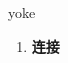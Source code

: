 
\begin{frame}
{\huge yoke}
\begin{center}
\begin{enumerate}\Large
  \item \textbf{连接}
\end{enumerate}
\end{center}
\end{frame}
